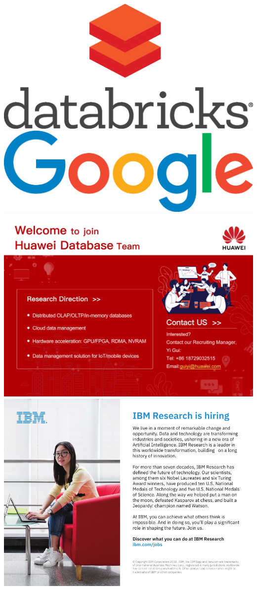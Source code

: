 \includegraphics[height=.49\textheight,width=\textwidth,keepaspectratio]{ads/databricks.eps}
\vfill
\includegraphics[height=.49\textheight,width=\textwidth,keepaspectratio]{ads/google.eps}
\pagebreak

\includegraphics[height=.49\textheight,width=\textwidth,keepaspectratio]{ads/huawei.jpg}
\vfill
\includegraphics[height=.49\textheight,width=\textwidth,keepaspectratio]{ads/ibm.pdf}
\pagebreak

